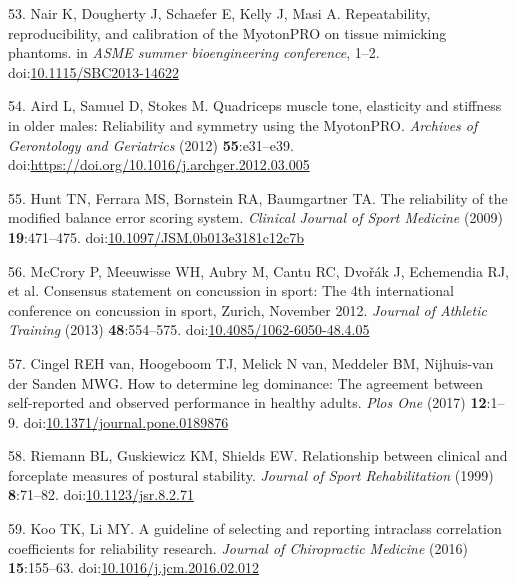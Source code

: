 \documentclass[
  english,
  man]{apa6}
\newenvironment{cslreferences}%
  {}%
  {\par}
\begin{document}
\begin{cslreferences}
\leavevmode\hypertarget{ref-Nair2014}{}%
53. Nair K, Dougherty J, Schaefer E, Kelly J, Masi A. Repeatability, reproducibility, and calibration of the MyotonPRO on tissue mimicking phantoms. in \emph{ASME summer bioengineering conference}, 1--2. doi:\href{https://doi.org/10.1115/SBC2013-14622}{10.1115/SBC2013-14622}

\leavevmode\hypertarget{ref-Aird2012}{}%
54. Aird L, Samuel D, Stokes M. Quadriceps muscle tone, elasticity and stiffness in older males: Reliability and symmetry using the MyotonPRO. \emph{Archives of Gerontology and Geriatrics} (2012) \textbf{55}:e31--e39. doi:\href{https://doi.org/https://doi.org/10.1016/j.archger.2012.03.005}{https://doi.org/10.1016/j.archger.2012.03.005}

\leavevmode\hypertarget{ref-Hunt2009}{}%
55. Hunt TN, Ferrara MS, Bornstein RA, Baumgartner TA. The reliability of the modified balance error scoring system. \emph{Clinical Journal of Sport Medicine} (2009) \textbf{19}:471--475. doi:\href{https://doi.org/10.1097/JSM.0b013e3181c12c7b}{10.1097/JSM.0b013e3181c12c7b}

\leavevmode\hypertarget{ref-McCrory2013}{}%
56. McCrory P, Meeuwisse WH, Aubry M, Cantu RC, Dvořák J, Echemendia RJ, et al. Consensus statement on concussion in sport: The 4th international conference on concussion in sport, Zurich, November 2012. \emph{Journal of Athletic Training} (2013) \textbf{48}:554--575. doi:\href{https://doi.org/10.4085/1062-6050-48.4.05}{10.4085/1062-6050-48.4.05}

\leavevmode\hypertarget{ref-VanCingel2017}{}%
57. Cingel REH van, Hoogeboom TJ, Melick N van, Meddeler BM, Nijhuis-van der Sanden MWG. How to determine leg dominance: The agreement between self-reported and observed performance in healthy adults. \emph{Plos One} (2017) \textbf{12}:1--9. doi:\href{https://doi.org/10.1371/journal.pone.0189876}{10.1371/journal.pone.0189876}

\leavevmode\hypertarget{ref-Riemann1999d}{}%
58. Riemann BL, Guskiewicz KM, Shields EW. Relationship between clinical and forceplate measures of postural stability. \emph{Journal of Sport Rehabilitation} (1999) \textbf{8}:71--82. doi:\href{https://doi.org/10.1123/jsr.8.2.71}{10.1123/jsr.8.2.71}

\leavevmode\hypertarget{ref-Koo2016}{}%
59. Koo TK, Li MY. A guideline of selecting and reporting intraclass correlation coefficients for reliability research. \emph{Journal of Chiropractic Medicine} (2016) \textbf{15}:155--63. doi:\href{https://doi.org/10.1016/j.jcm.2016.02.012}{10.1016/j.jcm.2016.02.012}


\end{cslreferences}
\end{document}
